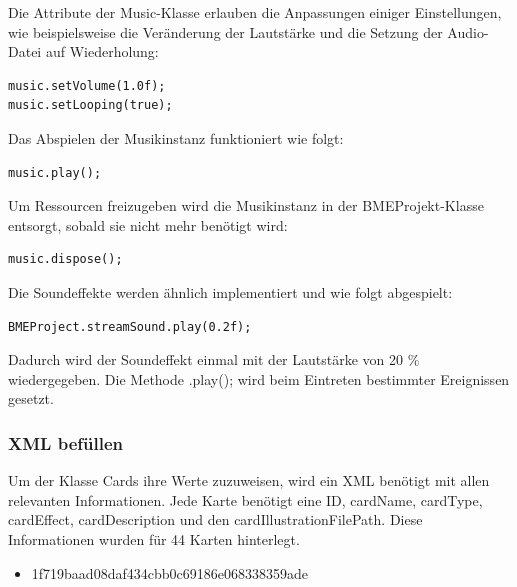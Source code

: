 Die Attribute der Music-Klasse erlauben die Anpassungen einiger Einstellungen, wie beispielsweise die Veränderung der Lautstärke und die Setzung der Audio-Datei auf Wiederholung:

\begin{lstlisting}
music.setVolume(1.0f);
music.setLooping(true);
\end{lstlisting}

Das Abspielen der Musikinstanz funktioniert wie folgt:

\begin{lstlisting}
music.play();
\end{lstlisting}

Um Ressourcen freizugeben wird die Musikinstanz in der BMEProjekt-Klasse entsorgt, sobald sie nicht mehr benötigt wird:

\begin{lstlisting}
music.dispose();
\end{lstlisting}

Die Soundeffekte werden ähnlich implementiert und wie folgt abgespielt: 
\begin{lstlisting}
BMEProject.streamSound.play(0.2f);
\end{lstlisting}

Dadurch wird der Soundeffekt einmal mit der Lautstärke von 20 \% wiedergegeben. Die Methode .play(); wird beim Eintreten bestimmter Ereignissen gesetzt.

\subsubsection{XML befüllen}
Um der Klasse Cards ihre Werte zuzuweisen, wird ein XML benötigt mit allen relevanten Informationen. Jede Karte benötigt eine ID, cardName, cardType, cardEffect, cardDescription und den cardIllustrationFilePath. Diese Informationen wurden für 44 Karten hinterlegt.
\begin{itemize}
\item 1f719baad08daf434cbb0c69186e068338359ade
\end{itemize}

